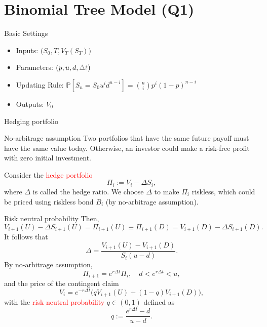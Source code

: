 \documentclass{beamer}
\begin{document}
\section[BOPM]{Binomial Tree Model (Q1)}
\begin{frame}{Basic Settings}
    \begin{itemize}
        \item Inputs: $\big(S_0, T, V_T(S_T)\big)$
        \item Parameters: $(p, u, d,\textcolor{gray}{\Delta t})$
        \item Updating Rule:
        $\mathbb{P}[S_n=S_0u^id^{n-i}] = \binom{n}{i} p^i (1-p)^{n-i}$
        \item Outputs: $V_0$
    \end{itemize}
    \centering
\end{frame}

\begin{frame}{Hedging portfolio}
\begin{block}{No-arbitrage assumption}
Two portfolios that have the same future payoff must have the same value today. Otherwise, an investor could make a risk-free profit with zero initial investment.
\end{block}
Consider the \textcolor{red}{hedge portfolio}
\[
\Pi_i:=V_i - \Delta S_i,
\]
where $\Delta$ is called the hedge ratio. We choose $\Delta$ to make $\Pi_i$ riskless, which could be priced using riskless bond $B_i$ (by no-arbitrage assumption).
\end{frame}

\begin{frame}{Risk neutral probability}
Then,
\begin{equation*}
    V_{i+1}(U) - \Delta S_{i+1}(U) = \Pi_{i+1}(U)\equiv\Pi_{i+1}(D) = V_{i+1}(D) - \Delta S_{i+1}(D).
\end{equation*}
It follows that
\[
\Delta = \frac{V_{i+1}(U) - V_{i+1}(D)}{S_i(u-d)}.
\]
By no-arbitrage assumption,
\[
\Pi_{i+1} = e^{r\Delta t}\Pi_i, \quad d<e^{r\Delta t} < u,
\]
and the price of the contingent claim
\[
\boxed{V_{i} = e^{-r\Delta t} \big(qV_{i+1}(U) + (1-q)V_{i+1}(D)\big),}
\]
with the \textcolor{red}{risk neutral probability} $q\in (0, 1)$ defined as
\[
\boxed{q:= \frac{e^{r\Delta t} - d}{ u - d}.}
\]
\end{frame}
\end{document}
